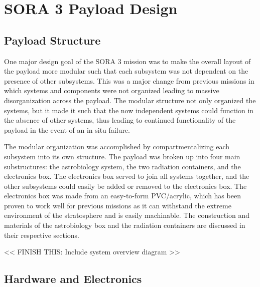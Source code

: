 \section{SORA 3 Payload Design}
\label{sec:Design}

\subsection{Payload Structure}
One major design goal of the SORA 3 mission was to make the overall layout of the payload more modular such that each subsystem was not dependent on the presence of other subsystems.
This was a major change from previous missions in which systems and components were not organized leading to massive disorganization across the payload.
The modular structure not only organized the systems, but it made it such that the now independent systems could function in the absence of other systems, thus leading to continued functionality of the payload in the event of an in situ failure.

The modular organization was accomplished by compartmentalizing each subsystem into its own structure.
The payload was broken up into four main substructures: the astrobiology system, the two radiation containers, and the electronics box.
The electronics box served to join all systems together, and the other subsystems could easily be added or removed to the electronics box.
The electronics box was made from an easy-to-form PVC/acrylic, which has been proven to work well for previous missions as it can withstand the extreme environment of the stratosphere and is easily machinable.
The construction and materials of the astrobiology box and the radiation containers are discussed in their respective sections.


<< FINISH THIS: Include system overview diagram >>
\subsection{Hardware and Electronics}
